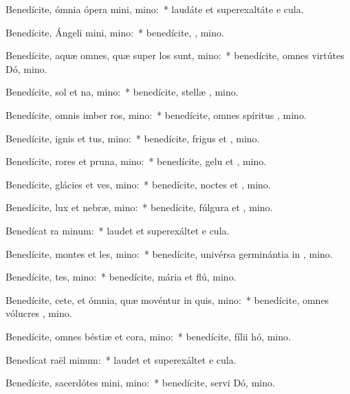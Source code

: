 \item Benedícite, ómnia ópera mini, mino:~* laudáte et superexaltáte e  cula.
\item Benedícite, Ángeli mini, mino:~* benedícite, , mino.
\item Benedícite, aquæ omnes, quæ super los sunt, mino:~* benedícite, omnes virtútes Dó, mino.
\item Benedícite, sol et na, mino:~* benedícite, stellæ , mino.
\item Benedícite, omnis imber  ros, mino:~* benedícite, omnes spíritus , mino.
\item Benedícite, ignis et tus, mino:~* benedícite, frigus et , mino.
\item Benedícite, rores et pruna, mino:~* benedícite, gelu et , mino.
\item Benedícite, glácies et ves, mino:~* benedícite, noctes et , mino.
\item Benedícite, lux et nebræ, mino:~* benedícite, fúlgura et , mino.
\item Benedícat ra minum:~* laudet et superexáltet e  cula.
\item Benedícite, montes et les, mino:~* benedícite, univérsa germinántia in , mino.
\item Benedícite, tes, mino:~* benedícite, mária et flú, mino.
\item Benedícite, cete, et ómnia, quæ movéntur in quis, mino:~* benedícite, omnes vólucres , mino.
\item Benedícite, omnes béstiæ et cora, mino:~* benedícite, fílii hó, mino.
\item Benedícat raël minum:~* laudet et superexáltet e  cula.
\item Benedícite, sacerdótes mini, mino:~* benedícite, servi Dó, mino.
